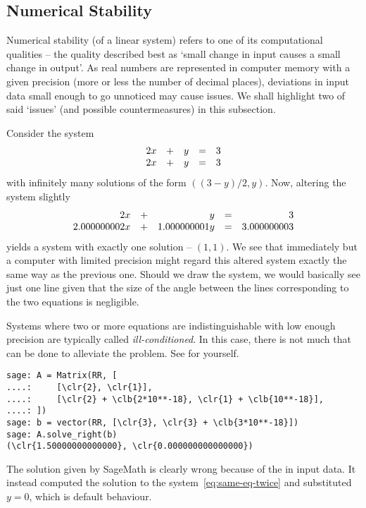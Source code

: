 \subsection{Numerical Stability}
\label{ssec:numerical-stability}

Numerical stability (of a linear system) refers to one of its computational
qualities -- the quality described best as `small change in input causes a small
change in output'. As real numbers are represented in computer memory with a
given precision (more or less the number of decimal places), deviations in input
data small enough to go unnoticed may cause issues. We shall highlight two of
said `issues' (and possible countermeasures) in this subsection.

Consider the system
\begin{equation}
 \label{eq:same-eq-twice}
 \begin{array}{r c r c r}
  2x & + & y & = & 3\\
  2x & + & y & = & 3
 \end{array}
\end{equation}
with infinitely many solutions of the form $((3-y) / 2, y)$. Now, altering the
system slightly
\[
 \begin{array}{r c r c r}
  2x & + & y & = & 3\\
  2.000000002x & + & 1.000000001y & = & 3.000000003
 \end{array}
\]
yields a system with exactly one solution -- $(1,1)$. We see that immediately
but a computer with limited precision might regard this altered system exactly
the same way as the previous one. Should we draw the system, we would basically
see just one line given that the size of the angle between the lines
corresponding to the two equations is negligible.

Systems where two or more equations are indistinguishable with low enough
precision are typically called \emph{ill-conditioned}. In this case, there is
not much that can be done to alleviate the problem. See for yourself.
\begin{Verbatim}
sage: A = Matrix(RR, [
....:     [\clr{2}, \clr{1}],
....:     [\clr{2} + \clb{2*10**-18}, \clr{1} + \clb{10**-18}],
....: ])
sage: b = vector(RR, [\clr{3}, \clr{3} + \clb{3*10**-18}])
sage: A.solve_right(b)
(\clr{1.50000000000000}, \clr{0.000000000000000})
\end{Verbatim}
The solution given by SageMath is clearly wrong because of the  in input data. It instead computed the solution to the
system~\eqref{eq:same-eq-twice} and substituted $y = 0$, which is default
behaviour.

